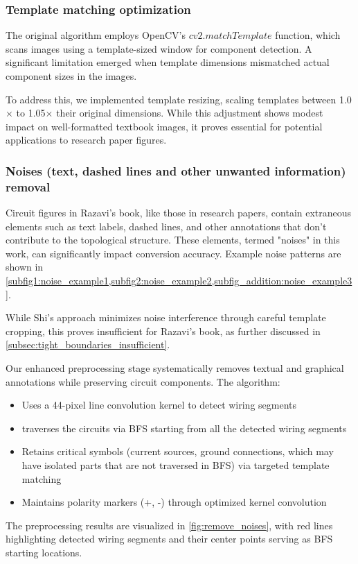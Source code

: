 \documentclass{article}
\begin{document}
\subsubsection{Template matching optimization}

The original algorithm employs OpenCV's $cv2.matchTemplate$ function, which scans images using a template-sized window for component detection. 
A significant limitation emerged when template dimensions mismatched actual component sizes in the images.

To address this, we implemented template resizing, scaling templates between 1.0$\times$ to 1.05$\times$ their original dimensions. 
While this adjustment shows modest impact on well-formatted textbook images, it proves essential for potential applications to research paper figures.

\subsubsection{Noises (text, dashed lines and other unwanted information) removal}\label{subsubsec:noises}

Circuit figures in Razavi's book, like those in research papers, contain extraneous elements such as text labels, dashed lines, and other annotations that don't contribute to the topological structure. 
These elements, termed "noises" in this work, can significantly impact conversion accuracy. 
Example noise patterns are shown in \cref{subfig1:noise_example1,subfig2:noise_example2,subfig_addition:noise_example3}.

While Shi's approach minimizes noise interference through careful template cropping, this proves insufficient for Razavi's book, as further discussed in \cref{subsec:tight_boundaries_insufficient}.

Our enhanced preprocessing stage systematically removes textual and graphical annotations while preserving circuit components. 
The algorithm:
\begin{itemize}
\item Uses a 44-pixel line convolution kernel to detect wiring segments
\item traverses the circuits via BFS starting from all the detected wiring segments
\item Retains critical symbols (current sources, ground connections, which may have isolated parts that are not traversed in BFS) via targeted template matching
\item Maintains polarity markers (+, -) through optimized kernel convolution
\end{itemize}
The preprocessing results are visualized in \cref{fig:remove_noises}, 
with red lines highlighting detected wiring segments and their center points serving as BFS starting locations.
\end{document}
